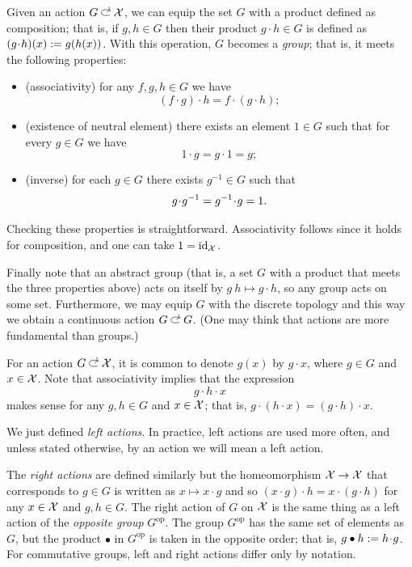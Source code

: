 Given an action $G\acts\c{X}$, we can equip the set $G$ with a product defined as composition;
that is, if $g,h\in G$ then their product $g\cdot h\in G$ is defined as
$(g\cdot h)(x)\df g(h(x))$.
With this operation, $G$ becomes a \emph{group}; that is, it meets the following properties:
\begin{itemize}
\item (associativity) for any $f,g,h\in G$ we have
\[(f\cdot g)\cdot h=f\cdot (g\cdot h);\]
\item (existence of neutral element) there exists an element $1\in G$ such that for every $g\in G$ we have
\[1\cdot g=g\cdot 1=g;\]
\item (inverse) for each $g\in G$ there exists $g^{-1}\in G$ such that
\[g\cdot g^{-1}\z=g^{-1}\cdot g=1.\]
\end{itemize}
Checking these properties is straightforward.
Associativity follows since it holds for composition, and one can take $1=\mathrm{id}_{\mathcal{X}}$.

Finally note that an abstract group (that is, a set $G$ with a product that meets the three properties above) acts on itself by $g\: h\mapsto g\cdot h$, so any group acts on some set.
Furthermore, we may equip $G$ with the discrete topology and this way we obtain a continuous action $G\acts G$.
(One may think that actions are more fundamental than groups.)

For an action $G\acts \c{X}$, it is common to denote $g(x)$ by $g\cdot x$, where $g\in G$ and $x\in\mathcal{X}$.
Note that associativity implies that the expression
\[g\cdot h\cdot x\]
makes sense for any $g,h\in G$ and $x\in \mathcal{X}$; that is, $g\cdot (h\cdot x)=(g\cdot h)\cdot x$.

We just defined \emph{left actions}.
In practice, left actions are used more often, and unless stated otherwise, by an action we will mean a left action.

The \emph{right actions} are defined similarly but the homeomorphism $\mathcal{X}\to \mathcal{X}$ that corresponds to $g\in G$ is written as $x\mapsto x\cdot g$ and so $(x\cdot g)\cdot h=x\cdot (g\cdot h)$ for any $x\in \mathcal{X}$ and $g,h\in G$.
The right action of $G$ on $\mathcal{X}$ is the same thing as a left action of the \emph{opposite group} $G^{\mathrm{op}}$.
The group $G^{\mathrm{op}}$ has the same set of elements as $G$, but the product $\bullet$ in $G^{\mathrm{op}}$ is taken in the opposite order; that is, $g\bullet h\df h\cdot g$.
For commutative groups, left and right actions differ only by notation.


